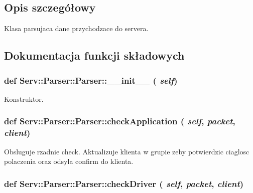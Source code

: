 \subsection{Opis szczegółowy}
\begin{DoxyVerb}Klasa parsujaca dane przychodzace do servera.\end{DoxyVerb}
 

\subsection{Dokumentacja funkcji składowych}
\hypertarget{class_serv_1_1_parser_1_1_parser_a8627f07c762983eff029ad167a021e38}{
\subsubsection[{\_\-\_\-init\_\-\_\-}]{\setlength{\rightskip}{0pt plus 5cm}def Serv::Parser::Parser::\_\-\_\-init\_\-\_\- ( {\em self})}}
\label{class_serv_1_1_parser_1_1_parser_a8627f07c762983eff029ad167a021e38}
\begin{DoxyVerb}Konstruktor.\end{DoxyVerb}
 \hypertarget{class_serv_1_1_parser_1_1_parser_a8c0d6b83193d0e972e50887c7640181d}{
\subsubsection[{checkApplication}]{\setlength{\rightskip}{0pt plus 5cm}def Serv::Parser::Parser::checkApplication ( {\em self}, \/   {\em packet}, \/   {\em client})}}
\label{class_serv_1_1_parser_1_1_parser_a8c0d6b83193d0e972e50887c7640181d}
\begin{DoxyVerb}Obsluguje rzadnie check. Aktualizuje klienta w grupie zeby potwierdzic ciaglosc polaczenia oraz odsyla confirm do klienta.\end{DoxyVerb}
 \hypertarget{class_serv_1_1_parser_1_1_parser_aa6c504eb2ef2712d8f05cec0e94f3eba}{
\subsubsection[{checkDriver}]{\setlength{\rightskip}{0pt plus 5cm}def Serv::Parser::Parser::checkDriver ( {\em self}, \/   {\em packet}, \/   {\em client})}}
